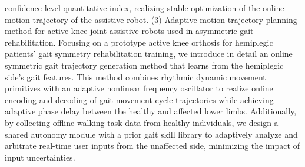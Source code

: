 \begin{abstract*}
confidence level quantitative index, realizing stable optimization of the online motion trajectory of the assistive robot. (3) Adaptive motion trajectory planning method for active knee joint assistive robots used in asymmetric gait rehabilitation. Focusing on a prototype active knee orthosis for hemiplegic patients' gait symmetry rehabilitation training, we introduce in detail an online symmetric gait trajectory generation method that learns from the hemiplegic side's gait features. This method combines rhythmic dynamic movement primitives with an adaptive nonlinear frequency oscillator to realize online encoding and decoding of gait movement cycle trajectories while achieving adaptive phase delay between the healthy and affected lower limbs. Additionally, by collecting offline walking task data from healthy individuals, we design a shared autonomy module with a prior gait skill library to adaptively analyze and arbitrate real-time user inputs from the unaffected side, minimizing the impact of input uncertainties.
\end{abstract*}

